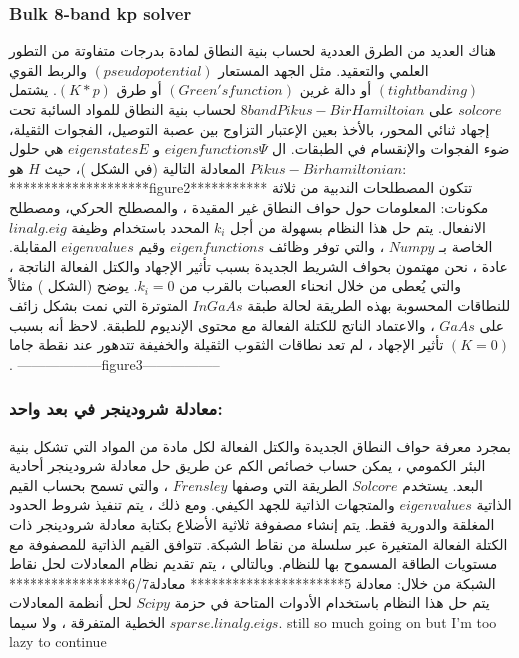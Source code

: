 \subsubsection{Bulk 8-band kp solver}
هناك العديد من الطرق العددية لحساب بنية النطاق لمادة بدرجات متفاوتة من التطور العلمي  والتعقيد. مثل الجهد المستعار $ (pseudopotential) $  والربط القوي $ (tight banding ) $ أو دالة غرين $ (Green's function) $ أو طرق $ (K*p) $. يشتمل $ solcore  $ على $  8band Pikus-Bir Hamiltoian $ لحساب بنية النطاق للمواد السائبة تحت إجهاد ثنائي المحور، بالأخذ بعين الإعتبار التزاوج بين عصبة التوصيل، الفجوات الثقيلة، ضوء الفجوات والإنقسام في الطبقات.
ال $ eigenfunctions Ψ $ و $ eigenstates E$ هي حلول المعادلة التالية (في الشكل )، حيث $ H $ هو $ Pikus-Bir hamiltonian $:
********************figure2***********
تتكون المصطلحات الندبية من ثلاثة مكونات: المعلومات حول حواف النطاق غير المقيدة ، والمصطلح الحركي، ومصطلح الانفعال.
يتم حل هذا النظام بسهولة من أجل $ k_i $ المحدد باستخدام وظيفة $ linalg.eig $ الخاصة بـ $ Numpy $ ، والتي توفر وظائف $ eigenfunctions $ وقيم $ eigenvalues $ المقابلة. عادة ، نحن مهتمون بحواف الشريط الجديدة بسبب تأثير الإجهاد والكتل الفعالة الناتجة ، والتي يُعطى من خلال انحناء العصبات بالقرب من $ k_i = 0 $. يوضح (الشكل ) مثالاً للنطاقات المحسوبة بهذه الطريقة لحالة طبقة $ InGaAs $ المتوترة التي نمت بشكل زائف على $ GaAs $ ، والاعتماد الناتج للكتلة الفعالة مع محتوى الإنديوم للطبقة. لاحظ أنه بسبب تأثير الإجهاد ، لم تعد نطاقات الثقوب الثقيلة والخفيفة تتدهور عند نقطة جاما $ (K = 0) $.
------------------figure3-----------------
\subsubsection{معادلة شرودينجر في بعد واحد:}
بمجرد معرفة حواف النطاق الجديدة والكتل الفعالة لكل مادة من المواد التي تشكل بنية البئر الكمومي ، يمكن حساب خصائص الكم عن طريق حل معادلة شرودينجر أحادية البعد. يستخدم $ Solcore $ الطريقة التي وصفها $ Frensley $ ، والتي تسمح بحساب القيم الذاتية $ eigenvalues $ والمتجهات الذاتية للجهد الكيفي. ومع ذلك ، يتم تنفيذ شروط الحدود المغلقة والدورية فقط.
يتم إنشاء مصفوفة ثلاثية الأضلاع بكتابة معادلة شرودينجر ذات الكتلة الفعالة المتغيرة عبر سلسلة من نقاط الشبكة. تتوافق القيم الذاتية للمصفوفة مع مستويات الطاقة المسموح بها للنظام. وبالتالي ، يتم تقديم نظام المعادلات لحل نقاط الشبكة من خلال:
معادلة 5**********************
معادلة6/7*****************
يتم حل هذا النظام باستخدام الأدوات المتاحة في حزمة $ Scipy $ لحل أنظمة المعادلات الخطية المتفرقة ، ولا سيما $ sparse.linalg.eigs $.
still so much going on but I'm too lazy to continue 



